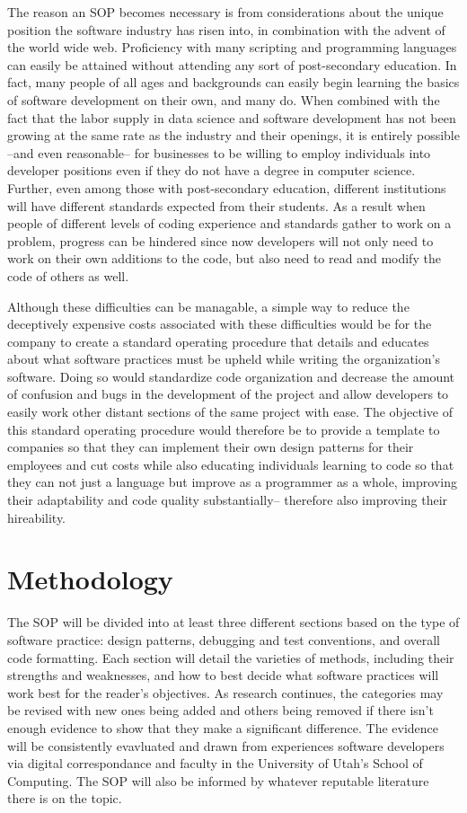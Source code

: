 \documentclass[12pt, letterpaper]{article}
\begin{document}
  The reason an SOP becomes necessary is from considerations about the unique position the software industry has risen into, in combination with the advent of the world wide web. Proficiency with many
  scripting and programming languages can easily be attained without attending any sort of post-secondary education. In fact, many people of all ages and backgrounds can easily begin learning the
  basics of software development on their own, and many do. When combined with the fact that the labor supply in data science and software development has not been growing at the same rate as the industry
  and their openings, it is entirely possible --and even reasonable-- for businesses to be willing to employ individuals into developer positions even if they do not have a degree in computer science. Further, even among
  those with post-secondary education, different institutions will have different standards expected from their students. As a result when people of different levels of coding experience and standards
  gather to work on a problem, progress can be hindered since now developers will not only need to work on their own additions to the code, but also need to read and modify the code of others as well.

  Although these difficulties can be managable, a simple way to reduce the deceptively expensive costs associated with these difficulties would be for the company to create a standard operating
  procedure that details and educates about what software practices must be upheld while writing the organization's software. Doing so would standardize code organization and decrease the amount of
  confusion and bugs in the development of the project and allow developers to easily work other distant sections of the same project with ease. The objective of this standard operating procedure
  would therefore be to provide a template to companies so that they can implement their own design patterns for their employees and cut costs while also educating individuals learning to code
  so that they can not just a language but improve as a programmer as a whole, improving their adaptability and code quality substantially-- therefore also improving their hireability.
\section{Methodology}
  The SOP will be divided into at least three different sections based on the type of software practice: design patterns, debugging and test conventions, and overall code formatting.
  Each section will detail the varieties of methods, including their strengths and weaknesses, and how to best decide what software practices will work best for the reader's objectives. As research continues,
  the categories may be revised with new ones being added and others being removed if there isn't enough evidence to show that they make a significant difference. The evidence will be consistently evavluated and drawn from experiences software developers via digital correspondance and faculty in the University of Utah's School of Computing. The SOP will also
  be informed by whatever reputable literature there is on the topic.
\end{document}
